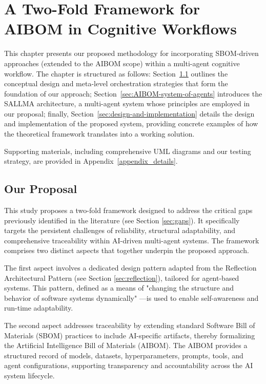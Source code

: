 \chapter{A Two-Fold Framework for AIBOM in Cognitive Workflows}\label{ch:chapter2}


This chapter presents our proposed methodology for incorporating SBOM-driven approaches (extended to the AIBOM scope) within a multi-agent cognitive workflow. The chapter is structured as follows: Section~\ref{sec:proposal} outlines the conceptual design and meta-level orchestration strategies that form the foundation of our approach; Section~\ref{sec:AIBOM-system-of-agents} introduces the SALLMA architecture, a multi-agent system whose principles are employed in our proposal; finally, Section~\ref{sec:design-and-implementation} details the design and implementation of the proposed system, providing concrete examples of how the theoretical framework translates into a working solution. 

Supporting materials, including comprehensive UML diagrams and our testing strategy, are provided in Appendix~\ref{appendix_details}.


\section{Our Proposal} \label{sec:proposal}

This study proposes a two-fold framework designed to address the critical gaps previously identified in the literature (see Section \ref{sec:gaps}). It specifically targets the persistent challenges of reliability, structural adaptability, and comprehensive traceability within AI-driven multi-agent systems. The framework comprises two distinct aspects that together underpin the proposed approach.

The first aspect involves a dedicated design pattern adapted from the Reflection Architectural Pattern (see Section \ref{sec:reflection}), tailored for agent-based systems. This pattern, defined as a means of "changing the structure and behavior of software systems dynamically" \cite{Buschmann1996}—is used to enable self-awareness and run-time adaptability.

The second aspect addresses traceability by extending standard Software Bill of Materials (SBOM) practices to include AI-specific artifacts, thereby formalizing the Artificial Intelligence Bill of Materials (AIBOM). The AIBOM provides a structured record of models, datasets, hyperparameters, prompts, tools, and agent configurations, supporting transparency and accountability across the AI system lifecycle.



